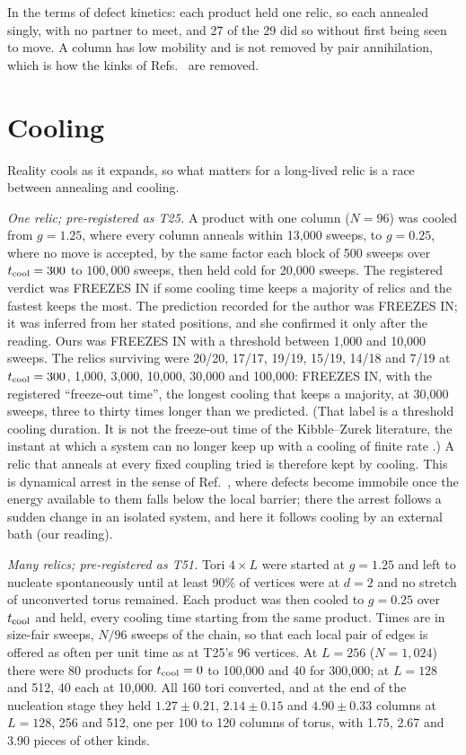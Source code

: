 \documentclass[aps,pre,10pt,twocolumn,superscriptaddress,nofootinbib]{revtex4-2}
\begin{document}
In the terms of defect kinetics: each product held one relic, so each annealed singly, with no partner to
meet, and 27 of the 29 did so without first being seen to move. A column has low mobility and is not removed
by pair annihilation, which is how the kinks of Refs.~\cite{JC26,JYC25} are removed.

\section{Cooling}
\label{sec:cooling}

Reality cools as it expands, so what matters for a long-lived relic is a race between annealing and cooling.

\emph{One relic; pre-registered as T25.} A product with one column ($N = 96$) was cooled from $g = 1.25$, where
every column anneals within 13,000 sweeps, to $g = 0.25$, where no move is accepted, by the same factor each
block of 500 sweeps over $t_{\rm cool} = 300$ to $100{,}000$ sweeps, then held cold for 20,000 sweeps. The
registered verdict was FREEZES IN if some cooling time keeps a majority of relics and the fastest keeps the
most. The prediction recorded for the author was FREEZES IN; it was inferred from her stated positions, and
she confirmed it only after the reading. Ours was FREEZES IN with a threshold between 1,000 and 10,000 sweeps.
The relics surviving were 20/20, 17/17, 19/19, 15/19, 14/18 and 7/19 at $t_{\rm cool} = 300$, 1,000, 3,000,
10,000, 30,000 and 100,000: FREEZES IN, with the registered ``freeze-out time'', the longest cooling that keeps
a majority, at 30,000 sweeps, three to thirty times longer than we predicted. (That label is a threshold
cooling duration. It is not the freeze-out time of the Kibble--Zurek literature, the instant at which a system
can no longer keep up with a cooling of finite rate \cite{dCZ14}.) A relic that anneals at every fixed coupling
tried is therefore kept by cooling. This is dynamical arrest in the sense of Ref.~\cite{JC26}, where defects
become immobile once the energy available to them falls below the local barrier; there the arrest follows a
sudden change in an isolated system, and here it follows cooling by an external bath (our reading).

\emph{Many relics; pre-registered as T51.} Tori $4 \times L$ were started at $g = 1.25$ and left to nucleate
spontaneously until at least 90\% of vertices were at $d = 2$ and no stretch of unconverted torus remained.
Each product was then cooled to $g = 0.25$ over $t_{\rm cool}$ and held, every cooling time starting from the
same product. Times are in size-fair sweeps, $N/96$ sweeps of the chain, so that each local pair of edges is
offered as often per unit time as at T25's 96 vertices. At $L = 256$ ($N = 1{,}024$) there were 80 products
for $t_{\rm cool} = 0$ to 100,000 and 40 for 300,000; at $L = 128$ and 512, 40 each at 10,000. All 160 tori
converted, and at the end of the nucleation stage they held $1.27 \pm 0.21$, $2.14 \pm 0.15$ and $4.90 \pm 0.33$
columns at $L = 128$, 256 and 512, one per 100 to 120 columns of torus, with 1.75, 2.67 and 3.90 pieces of
other kinds.
\end{document}
